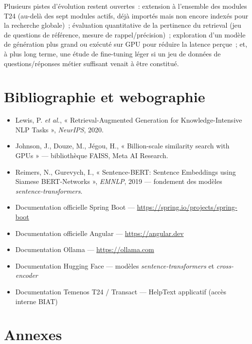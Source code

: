 ﻿\documentclass[12pt,a4paper]{report}
\begin{document}
Plusieurs pistes d'évolution restent ouvertes~: extension à l'ensemble des modules T24 (au-delà des sept modules actifs, déjà importés mais non encore indexés pour la recherche globale)~; évaluation quantitative de la pertinence du retrieval (jeu de questions de référence, mesure de rappel/précision)~; exploration d'un modèle de génération plus grand ou exécuté sur GPU pour réduire la latence perçue~; et, à plus long terme, une étude de fine-tuning léger si un jeu de données de questions/réponses métier suffisant venait à être constitué.

\chapter*{Bibliographie et webographie}
\begin{itemize}[leftmargin=1.4em]
  \item Lewis, P. \emph{et al.}, « Retrieval-Augmented Generation for Knowledge-Intensive NLP Tasks », \emph{NeurIPS}, 2020.
  \item Johnson, J., Douze, M., Jégou, H., « Billion-scale similarity search with GPUs » --- bibliothèque FAISS, Meta AI Research.
  \item Reimers, N., Gurevych, I., « Sentence-BERT: Sentence Embeddings using Siamese BERT-Networks », \emph{EMNLP}, 2019 --- fondement des modèles \emph{sentence-transformers}.
  \item Documentation officielle Spring Boot --- \url{https://spring.io/projects/spring-boot}
  \item Documentation officielle Angular --- \url{https://angular.dev}
  \item Documentation Ollama --- \url{https://ollama.com}
  \item Documentation Hugging Face --- modèles \emph{sentence-transformers} et \emph{cross-encoder}
  \item Documentation Temenos T24 / Transact --- HelpText applicatif (accès interne BIAT)
\end{itemize}

\chapter*{Annexes}
\end{document}
